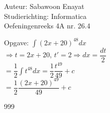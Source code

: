 \documentclass[a4paper]{article}
\begin{document}
  
\noindent \large Auteur: Sabawoon Enayat \\
\noindent \large Studierichting: Informatica\\
\noindent \large Oefeningenreeks 4A nr. 26.4 \\

\newcommand{\dint}{\displaystyle\int}

\medskip

\normalsize

Opgave: $\dint (2x + 20)^48 dx$\\

$\Rightarrow t = 2x + 20$, $t' = 2 \Rightarrow dx = \dfrac{dt}{2}$\\

$= \dfrac{1}{2}\dint t^{48} dx = \dfrac{1}{2}\dfrac{t^{49}}{49} + c$\\

$= \dfrac{1}{2}\dfrac{(2x + 20)^{49}}{49} + c$\\

\begin{thebibliography}{999}
\end{thebibliography}
\end{document}

